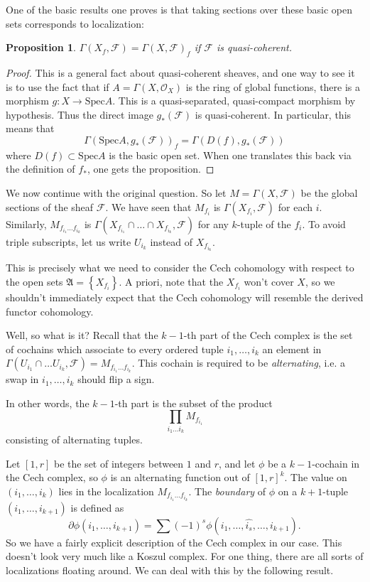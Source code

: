 \documentclass{article}
\newtheorem{proposition}{Proposition}
\begin{document}
One of the basic results one proves is that taking sections over these basic
open sets corresponds to localization:
\begin{proposition} 
$\Gamma(X_f, \mathcal{F}) = \Gamma(X, \mathcal{F})_f$ if $\mathcal{F}$ is
quasi-coherent.
\end{proposition} 

\newcommand{\spec}{\mathrm{Spec}}
\begin{proof} 
This is a general fact about quasi-coherent sheaves, and one way to see it is
to use the fact that if $A = \Gamma(X, \mathcal{O}_X)$ is the ring of global
functions, there is a morphism $g: X \to \mathrm{Spec} A$. This is a quasi-separated,
quasi-compact morphism by hypothesis. Thus the direct image $g_*(\mathcal{F})$
is quasi-coherent. In particular, this means that
\[ \Gamma(\mathrm{Spec} A, g_*(\mathcal{F}))_f = \Gamma(D(f), g_*(\mathcal{F}))  \]
where $D(f) \subset \mathrm{Spec} A$ is the basic open set. When one translates this
back via the definition of $f_*$, one gets the proposition.

\end{proof} 

We now continue with the original question.
So let $M = \Gamma(X, \mathcal{F})$ be the global sections of the sheaf
$\mathcal{F}$. We have seen that $M_{f_i}$ is $\Gamma(X_{f_i}, \mathcal{F})$
for each $i$. Similarly, $M_{f_{i_1} \dots f_{i_k}}$ is $\Gamma(X_{f_{i_1}}
\cap \dots \cap X_{f_{i_k}}, \mathcal{F})$ for any $k$-tuple of the $f_i$.
To avoid triple subscripts, let us write $U_{i_k}$ instead of $X_{f_{i_k}}$.

This is precisely what we need to consider the Cech cohomology with respect to
the open sets $\mathfrak{A} = \left\{X_{f_i}\right\}$. A priori, note that the
$X_{f_i}$ won't cover $X$, so we shouldn't immediately expect that the Cech
cohomology will resemble the derived functor cohomology.

Well, so what is it? Recall that the $k-1$-th part of the Cech complex is the set
of cochains which associate to every ordered tuple $i_1, \dots, i_k$ 
an element in $\Gamma(U_{i_1} \cap \dots U_{i_k}, \mathcal{F}) = M_{f_{i_1}
\dots f_{i_k}}$. This cochain is required to be \emph{alternating}, i.e. a swap
in $i_1, \dots, i_k$ should flip a sign. 

In other words, the $k-1$-th part is the subset of the product
\[ \prod_{i_1 \dots i_k} M_{f_{i_1}}  \]
consisting of alternating tuples. 

Let $[1,r]$ be the set of integers between $1$ and $r$, and  let $\phi$ be a
$k-1$-cochain in the Cech complex, so $\phi$ is an alternating function out of $[1,
r]^k$. The value on $(i_1, \dots, i_k)$ lies in the localization $M_{f_{i_1}
\dots f_{i_k}}$.
The \emph{boundary } of $\phi$ on a $k+1$-tuple $(i_1, \dots, i_{k+1})$ is defined
as 
\[ \partial \phi(i_1, \dots, i_{k+1}) =  \sum (-1)^s \phi(i_1, \dots, \hat{i_s},
\dots, i_{k+1}).    \]
So we have a fairly explicit description of the Cech complex in our case. This
doesn't look very much like a Koszul complex. For one thing, there are all
sorts of localizations floating around.
We can deal with this by the following result.
\end{document}
